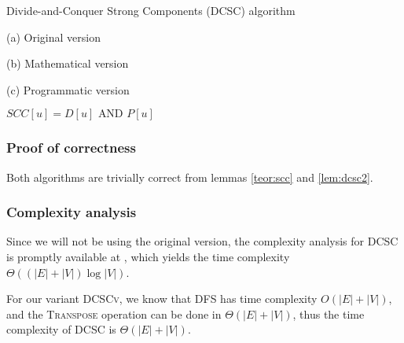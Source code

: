 \begin{algorithm}[H]
    \caption{Divide-and-Conquer Strong Components (DCSC) algorithm}
    \label{alg-dcsc}
    \begin{minipage}[t]{0.49\linewidth}
        (a) Original version
        \begin{algorithmic}[1]
                 
                 
                 
                \State {}
            \EndFunction
        \end{algorithmic}
    \end{minipage}
    \begin{minipage}[t]{0.49\linewidth}
        (b) Mathematical version
        \begin{algorithmic}[1]
                 
                 
                \State {}
            \EndFunction
        \end{algorithmic}
        (c) Programmatic version
        \begin{algorithmic}[1]
                 
                 
                 {$SCC[u] = D[u] \text{ AND } P[u]$}
                \EndFor
                \State {}
            \EndFunction
        \end{algorithmic}
    \end{minipage}
\end{algorithm}
\subsubsection{Proof of correctness}
Both algorithms are trivially correct from lemmas \ref{teor:scc} and \ref{lem:dcsc2}.
\subsubsection{Complexity analysis}
Since we will not be using the original version, the complexity analysis for \textsc{DCSC} is promptly available at \cite{fleischer-dcsc}, which yields the time complexity $\Theta((|E|+|V|) \log |V|)$.\par
For our variant \textsc{DCSCv}, we know that \textsc{DFS} has time complexity $O(|E|+|V|)$, and the \textsc{Transpose} operation can be done in $\Theta(|E|+|V|)$, thus the time complexity of \textsc{DCSC} is $\Theta(|E|+|V|)$.
